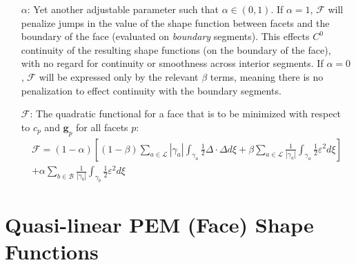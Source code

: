 \documentclass[11pt]{article} %
\begin{document}
\begin{itemize}
	\item[$\alpha$:] Yet another adjustable parameter such that $\alpha \in (0, 1)$. If $\alpha = 1$, $\mathcal{F}$ will penalize jumps in the value of the shape function between facets and the boundary of the face (evaluated on \textit{boundary} segments). This effects $C^0$ continuity of the resulting shape functions (on the boundary of the face), with no regard for continuity or smoothness across interior segments. If $\alpha = 0$, $\mathcal{F}$ will be expressed only by the relevant $\beta$ terms, meaning there is no penalization to effect continuity with the boundary segments.
	\item[$\mathcal{F}$:] The quadratic functional for a face that is to be minimized with respect to $c_p$ and $\mathbf{g}_p$ for all facets $p$:
	\begin{eqnarray}
	\mathcal{F} = (1-\alpha) \left[ (1-\beta) \sum_{a \in \mathcal{L}} | \gamma_a | \int_{\gamma_a} \frac{1}{2} \Delta \cdot \Delta d \xi + \beta \sum_{a \in \mathcal{L}} \frac{1}{| \gamma_a |} \int_{\gamma_a} \frac{1}{2} \varepsilon^2 d \xi \right] \nonumber \\ + \alpha \sum_{b \in \mathcal{B}} \frac{1}{| \gamma_b |} \int_{\gamma_b} \frac{1}{2} \varepsilon^2 d \xi
\end{eqnarray}
\end{itemize}

\section{Quasi-linear PEM (Face) Shape Functions}
\end{document}
